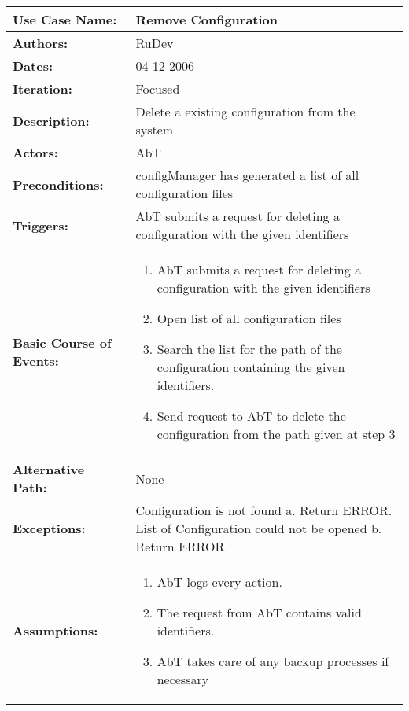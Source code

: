 \begin{tabularx}{\linewidth}{|l|X|}
\hline
\textbf{Use Case Name:} & \textbf{Remove Configuration} \\
\hline
\textbf{Authors:} & RuDev \\
\hline
\textbf{Dates:} & 04-12-2006 \\
\hline
\textbf{Iteration:} & Focused \\
\hline
\textbf{Description:} & Delete a existing configuration from the system\\
\hline
\textbf{Actors:} & AbT \\
\hline
\textbf{Preconditions:} & configManager has generated a list of all configuration files \\
\hline
\textbf{Triggers:} & AbT submits a request for deleting a configuration with the given identifiers \\
\hline
\textbf{Basic Course of Events:} & 
\begin{minipage}{\linewidth} 
  \vspace{0.05em}
  \begin{enumerate}
   \item AbT submits a request for deleting a configuration with the given identifiers
   \item Open list of all configuration files
   \item Search the list for the path of the configuration containing the given identifiers. 
   \item Send request to AbT to delete the configuration from the path given at step 3
  \end{enumerate}
  \vspace{0.05em}
\end{minipage}
\\
\hline 
\textbf{Alternative Path:} & None  \\
\hline
\textbf{Exceptions:} & Configuration is not found \newline a. Return ERROR. \newline \newline List of Configuration could not be opened \newline b. Return ERROR \\
\hline
\textbf{Assumptions:} & \begin{enumerate} 
							\item AbT logs every action.
							\item The request from AbT contains valid identifiers.
							\item AbT takes care of any backup processes if necessary

\end{enumerate}
\end{tabularx}
